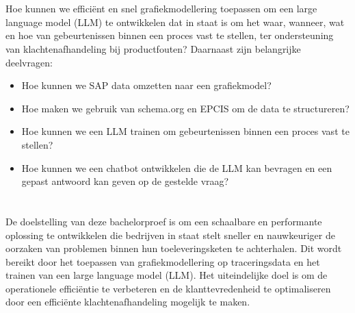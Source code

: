 \section{}%
\label{sec:onderzoeksvraag}

Hoe kunnen we efficiënt en snel grafiekmodellering toepassen om een large language model (LLM) te ontwikkelen dat in staat is om het waar, wanneer, wat en hoe van gebeurtenissen binnen een proces vast te stellen, ter ondersteuning van klachtenafhandeling bij productfouten?
Daarnaast zijn belangrijke deelvragen:
\begin{itemize}
    \item Hoe kunnen we SAP data omzetten naar een grafiekmodel?
    \item Hoe maken we gebruik van schema.org en EPCIS om de data te structureren?
    \item Hoe kunnen we een LLM trainen om gebeurtenissen binnen een proces vast te stellen?
    \item Hoe kunnen we een chatbot ontwikkelen die de LLM kan bevragen en een gepast antwoord kan geven op de gestelde vraag?
\end{itemize}
\section{}%
\label{sec:onderzoeksdoelstelling}

De doelstelling van deze bachelorproef is om een schaalbare en performante oplossing te ontwikkelen die bedrijven in staat stelt sneller en nauwkeuriger de oorzaken van problemen binnen hun toeleveringsketen te achterhalen. 
Dit wordt bereikt door het toepassen van grafiekmodellering op traceringsdata en het trainen van een large language model (LLM). 
Het uiteindelijke doel is om de operationele efficiëntie te verbeteren en de klanttevredenheid te optimaliseren door een efficiënte klachtenafhandeling mogelijk te maken.

